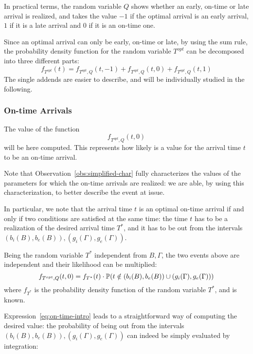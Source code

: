 In practical terms, the random variable \(Q\) shows whether an early, on-time or late arrival is realized,
and takes the value \(-1\) if the optimal arrival is an early arrival,
\(1\) if it is a late arrival and \(0\) if it is an on-time one.

Since an optimal arrival can only be early, on-time or late,
by using the sum rule,
the probability density function for the random variable \(T^{opt}\) can be decomposed into three different parts:
\begin{equation}
  \label{eq:pdf-decomposed-q}
  f_{T^{opt}}(t) = f_{T^{opt}, Q}(t, -1) + f_{T^{opt}, Q}(t, 0) + f_{T^{opt}, Q}(t, 1)
\end{equation}
The single addends are easier to describe,
and will be individually studied in the following.

\subsubsection{On-time Arrivals}

The value of the function
\begin{equation*}
  f_{T^{opt}, Q}(t, 0)
\end{equation*}
will be here computed.
This represents how likely is a value for the arrival time \(t\) to be an on-time arrival.

Note that Observation~\ref{obs:simplified-char} fully characterizes the values of the parameters for which the on-time arrivals are realized:
we are able, by using this characterization, to better describe the event at issue.

In particular, we note that the arrival time \(t\) is an optimal on-time arrival if and only if two conditions are satisfied at the same time:
the time \(t\) has to be a realization of the desired arrival time \(T^*\),
and it has to  be out from the intervals \((b_i(B), b_e(B)), (g_i(\Gamma), g_e(\Gamma))\).

Being the random variable \(T^*\) independent from \(B, \Gamma\),
the two events above are independent and their likelihood can be multiplied:
\begin{equation}
  \label{eq:on-time-intro}
  f_{T^{opt}, Q}(t, 0) = f_{T^*}(t) \cdot \mathbb{P}(t \notin (b_i(B), b_e(B)) \cup (g_i(\Gamma), g_e(\Gamma)))
\end{equation}
where \(f_{T^*}\) is the probability density function of the random variable \(T^*\), and is known.

Expression~\eqref{eq:on-time-intro} leads to a straightforward way of computing the desired value:
the probability of being out from the intervals \((b_i(B), b_e(B)), (g_i(\Gamma), g_e(\Gamma))\) can indeed be simply evaluated by integration:

